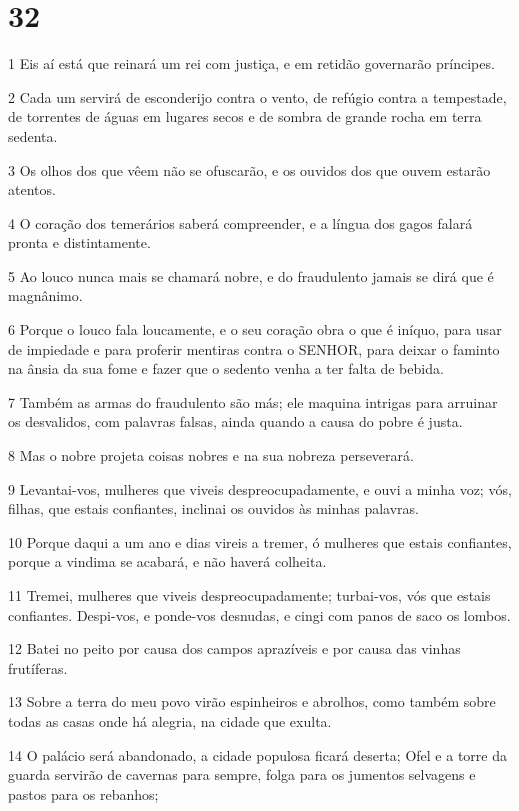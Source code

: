 \chapter{32}

\par 1 Eis aí está que reinará um rei com justiça, e em retidão governarão príncipes.
\par 2 Cada um servirá de esconderijo contra o vento, de refúgio contra a tempestade, de torrentes de águas em lugares secos e de sombra de grande rocha em terra sedenta.
\par 3 Os olhos dos que vêem não se ofuscarão, e os ouvidos dos que ouvem estarão atentos.
\par 4 O coração dos temerários saberá compreender, e a língua dos gagos falará pronta e distintamente.
\par 5 Ao louco nunca mais se chamará nobre, e do fraudulento jamais se dirá que é magnânimo.
\par 6 Porque o louco fala loucamente, e o seu coração obra o que é iníquo, para usar de impiedade e para proferir mentiras contra o SENHOR, para deixar o faminto na ânsia da sua fome e fazer que o sedento venha a ter falta de bebida.
\par 7 Também as armas do fraudulento são más; ele maquina intrigas para arruinar os desvalidos, com palavras falsas, ainda quando a causa do pobre é justa.
\par 8 Mas o nobre projeta coisas nobres e na sua nobreza perseverará.
\par 9 Levantai-vos, mulheres que viveis despreocupadamente, e ouvi a minha voz; vós, filhas, que estais confiantes, inclinai os ouvidos às minhas palavras.
\par 10 Porque daqui a um ano e dias vireis a tremer, ó mulheres que estais confiantes, porque a vindima se acabará, e não haverá colheita.
\par 11 Tremei, mulheres que viveis despreocupadamente; turbai-vos, vós que estais confiantes. Despi-vos, e ponde-vos desnudas, e cingi com panos de saco os lombos.
\par 12 Batei no peito por causa dos campos aprazíveis e por causa das vinhas frutíferas.
\par 13 Sobre a terra do meu povo virão espinheiros e abrolhos, como também sobre todas as casas onde há alegria, na cidade que exulta.
\par 14 O palácio será abandonado, a cidade populosa ficará deserta; Ofel e a torre da guarda servirão de cavernas para sempre, folga para os jumentos selvagens e pastos para os rebanhos;
